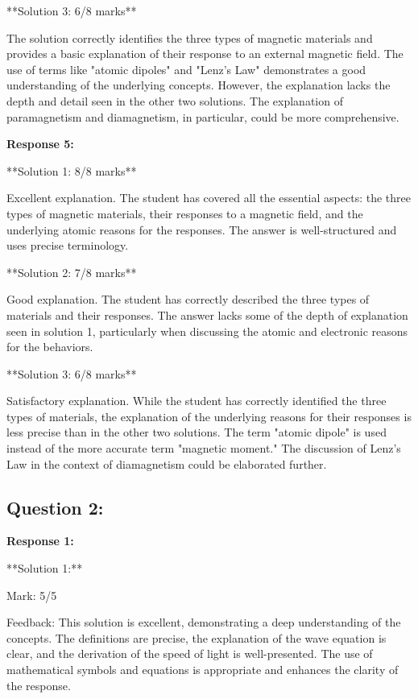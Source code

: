 \documentclass[a4paper,11pt]{article}
\begin{document}
**Solution 3: 6/8 marks**

The solution correctly identifies the three types of magnetic materials and provides a basic explanation of their response to an external magnetic field. The use of terms like "atomic dipoles" and "Lenz's Law" demonstrates a good understanding of the underlying concepts. However, the explanation lacks the depth and detail seen in the other two solutions. The explanation of paramagnetism and diamagnetism, in particular, could be more comprehensive.

\bigskip    
\textbf{Response 5:}

**Solution 1: 8/8 marks**

Excellent explanation. The student has covered all the essential aspects: the three types of magnetic materials, their responses to a magnetic field, and the underlying atomic reasons for the responses. The answer is well-structured and uses precise terminology.

**Solution 2: 7/8 marks**

Good explanation. The student has correctly described the three types of materials and their responses. The answer lacks some of the depth of explanation seen in solution 1, particularly when discussing the atomic and electronic reasons for the behaviors. 

**Solution 3: 6/8 marks**

Satisfactory explanation. While the student has correctly identified the three types of materials, the explanation of the underlying reasons for their responses is less precise than in the other two solutions. The term "atomic dipole" is used instead of the more accurate term "magnetic moment." The discussion of Lenz's Law in the context of diamagnetism could be elaborated further.

\subsection*{Question 2:}

\textbf{Response 1:}

**Solution 1:**

Mark: 5/5

Feedback: This solution is excellent, demonstrating a deep understanding of the concepts. The definitions are precise, the explanation of the wave equation is clear, and the derivation of the speed of light is well-presented. The use of mathematical symbols and equations is appropriate and enhances the clarity of the response.
\end{document}
